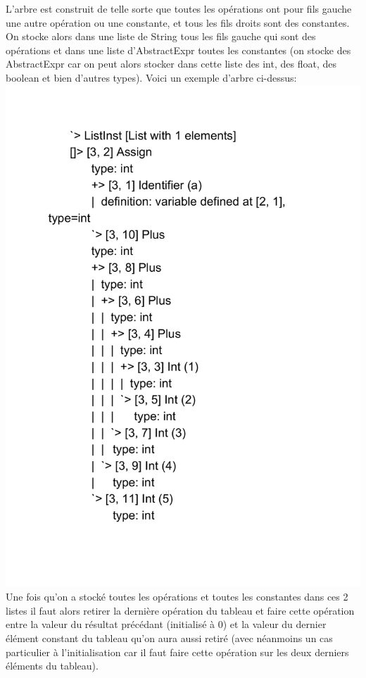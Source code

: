 \documentclass[a4paper]{article}
\begin{document}
L'arbre est construit de telle sorte que toutes les opérations ont pour fils gauche une autre opération ou une constante, et tous les fils droits sont des constantes. On stocke alors dans une liste de String tous les fils gauche qui sont des opérations et dans une liste d'AbstractExpr toutes les constantes (on stocke des AbstractExpr car on peut alors stocker dans cette liste des int, des float, des boolean et bien d'autres types). Voici un exemple d'arbre ci-dessus:\\
\includegraphics[scale=0.5]{Arbre_enrichi.pdf}\\
Une fois qu'on a stocké toutes les opérations et toutes les constantes dans ces 2 listes il faut alors retirer la dernière opération du tableau et faire cette opération entre la valeur du résultat précédant (initialisé à 0) et la valeur du dernier élément constant du tableau qu'on aura aussi retiré (avec néanmoins un cas particulier à l'initialisation car il faut faire cette opération sur les deux derniers éléments du tableau).\\ \\
\end{document}
